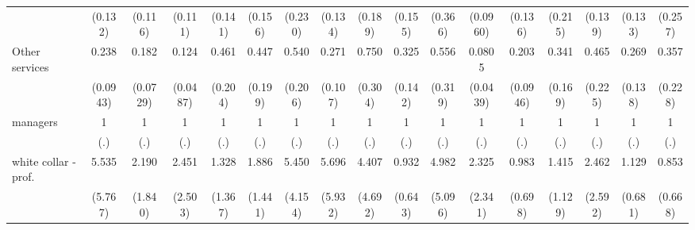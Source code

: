 {\begin{tabular}{l*{16}{c}}
                    &     (0.132)         &     (0.116)         &     (0.111)         &     (0.141)         &     (0.156)         &     (0.230)         &     (0.134)         &     (0.189)         &     (0.155)         &     (0.366)         &    (0.0960)         &     (0.136)         &     (0.215)         &     (0.139)         &     (0.133)         &     (0.257)         \\
[1em]
Other services      &       0.238\sym{***}&       0.182\sym{***}&       0.124\sym{***}&       0.461         &       0.447         &       0.540         &       0.271\sym{***}&       0.750         &       0.325\sym{**} &       0.556         &      0.0805\sym{***}&       0.203\sym{***}&       0.341\sym{*}  &       0.465         &       0.269\sym{*}  &       0.357         \\
                    &    (0.0943)         &    (0.0729)         &    (0.0487)         &     (0.204)         &     (0.199)         &     (0.206)         &     (0.107)         &     (0.304)         &     (0.142)         &     (0.319)         &    (0.0439)         &    (0.0946)         &     (0.169)         &     (0.225)         &     (0.138)         &     (0.228)         \\
[1em]
managers            &           1         &           1         &           1         &           1         &           1         &           1         &           1         &           1         &           1         &           1         &           1         &           1         &           1         &           1         &           1         &           1         \\
                    &         (.)         &         (.)         &         (.)         &         (.)         &         (.)         &         (.)         &         (.)         &         (.)         &         (.)         &         (.)         &         (.)         &         (.)         &         (.)         &         (.)         &         (.)         &         (.)         \\
[1em]
white collar - prof.&       5.535         &       2.190         &       2.451         &       1.328         &       1.886         &       5.450\sym{*}  &       5.696         &       4.407         &       0.932         &       4.982         &       2.325         &       0.983         &       1.415         &       2.462         &       1.129         &       0.853         \\
                    &     (5.767)         &     (1.840)         &     (2.503)         &     (1.367)         &     (1.441)         &     (4.154)         &     (5.932)         &     (4.692)         &     (0.643)         &     (5.096)         &     (2.341)         &     (0.698)         &     (1.129)         &     (2.592)         &     (0.681)         &     (0.668)         \\

\end{tabular}}
